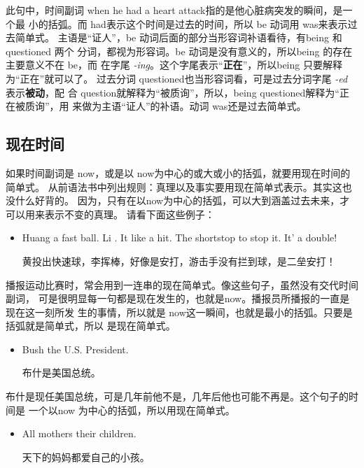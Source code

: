 此句中，时间副词 when he had a heart attack指的是他心脏病突发的瞬间，是一个最
小的括弧。而 had表示这个时间是过去的时间，所以 be 动词用 was来表示过去简单式。
主语是“证人”，be 动词后面的部分当形容词补语看待，有being 和 questioned 两个
分词，都视为形容词。be 动词是没有意义的，所以being 的存在主要意义不在 be，而
在字尾 \emph{-ing}。这个字尾表示“\textbf{正在}”，所以being 只要解释为“正在”就可以了。
过去分词 questioned也当形容词看，可是过去分词字尾 \emph{-ed} 表示\textbf{被动}，配
合 question就解释为“被质询”，所以，being questioned解释为“正在被质询”，用
来做为主语“证人”的补语。动词 was还是过去简单式。

\subsection{现在时间}

如果时间副词是 now，或是以 now为中心的或大或小的括弧，就要用现在时间的简单式。
从前语法书中列出规则：真理以及事实要用现在简单式表示。其实这也没什么好背的。
因为，只有在以now为中心的括弧，可以大到涵盖过去未来，才可以用来表示不变的真理。
请看下面这些例子：

\begin{itemize}
\item Huang  a fast ball. Li . It  like a hit. The shortstop
   to stop it. It' a double!

  黄投出快速球，李挥棒，好像是安打，游击手没有拦到球，是二垒安打！
\end{itemize}

播报运动比赛时，常会用到一连串的现在简单式。像这些句子，虽然没有交代时间副词，
可是很明显每一句都是现在发生的，也就是now。播报员所播报的一直是现在这一刻所发
生的事情，所以就是 now这一瞬间，也就是最小的括弧。只要是括弧就是简单式，所以
是现在简单式。

\begin{itemize}
\item  Bush  the U.S. President.

  布什是美国总统。
\end{itemize}

布什是现任美国总统，可是几年前他不是，几年后他也可能不再是。这个句子的时间是
一个以now 为中心的括弧，所以用现在简单式。

\begin{itemize}
\item  All mothers  their children.

  天下的妈妈都爱自己的小孩。
\end{itemize}

